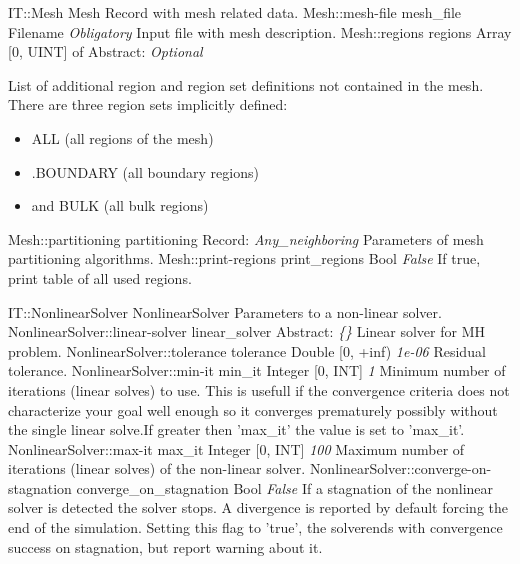 \begin{RecordType}
	{IT::Mesh}
	{Mesh}
	{} %
	{} %
	{{{Record with mesh related data.}}}
		\RecKey
			{Mesh::mesh-file}
			{mesh{\_}file}
			{{Filename}}
			{ \it{Obligatory} }
			{{{Input file with mesh description.}}}
		\RecKey
			{Mesh::regions}
			{regions}
			{{Array [0, UINT] of }{Abstract}{: }}
			{ \it{Optional} }
			{{{{List of additional region and region set definitions not contained in the mesh.}\\{
There are three region sets implicitly defined:}
}
\begin{itemize}
\item {ALL (all regions of the mesh)}
\item {.BOUNDARY (all boundary regions)}
\item {and BULK (all bulk regions)}
\end{itemize}
}}
		\RecKey
			{Mesh::partitioning}
			{partitioning}
			{{Record}{: }}
			{ \it{Any{\_}neighboring} }
			{{{Parameters of mesh partitioning algorithms.}}}
		\RecKey
			{Mesh::print-regions}
			{print{\_}regions}
			{{Bool}}
			{ \it{False} }
			{{{If true, print table of all used regions.}}}
\end{RecordType}
\begin{RecordType}
	{IT::NonlinearSolver}
	{NonlinearSolver}
	{} %
	{} %
	{{{Parameters to a non-linear solver.}}}
		\RecKey
			{NonlinearSolver::linear-solver}
			{linear{\_}solver}
			{{Abstract}{: }}
			{ \it{{\{}{\}}} }
			{{{Linear solver for MH problem.}}}
		\RecKey
			{NonlinearSolver::tolerance}
			{tolerance}
			{{Double [0, +inf)}}
			{ \it{1e-06} }
			{{{Residual tolerance.}}}
		\RecKey
			{NonlinearSolver::min-it}
			{min{\_}it}
			{{Integer [0, INT]}}
			{ \it{1} }
			{{{Minimum number of iterations (linear solves) to use. This is usefull if the convergence criteria does not characterize your goal well enough so it converges prematurely possibly without the single linear solve.If greater then 'max{\_}it' the value is set to 'max{\_}it'.}}}
		\RecKey
			{NonlinearSolver::max-it}
			{max{\_}it}
			{{Integer [0, INT]}}
			{ \it{100} }
			{{{Maximum number of iterations (linear solves) of the non-linear solver.}}}
		\RecKey
			{NonlinearSolver::converge-on-stagnation}
			{converge{\_}on{\_}stagnation}
			{{Bool}}
			{ \it{False} }
			{{{If a stagnation of the nonlinear solver is detected the solver stops. A divergence is reported by default forcing the end of the simulation. Setting this flag to 'true', the solverends with convergence success on stagnation, but report warning about it.}}}
\end{RecordType}

